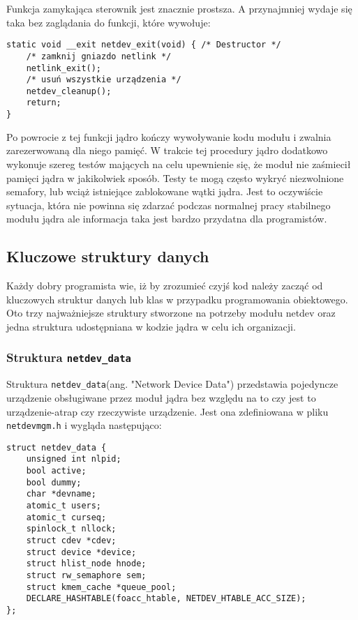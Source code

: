 \documentclass[10pt]{scrartcl}
\begin{document}
\newpage
Funkcja zamykająca sterownik jest znacznie prostsza. A przynajmniej wydaje się taka bez zaglądania do funkcji, które wywołuje:

\begin{verbatim}
static void __exit netdev_exit(void) { /* Destructor */
    /* zamknij gniazdo netlink */
    netlink_exit();
    /* usuń wszystkie urządzenia */
    netdev_cleanup();
    return;
}
\end{verbatim}

Po powrocie z tej funkcji jądro kończy wywoływanie kodu modułu i zwalnia zarezerwowaną dla niego pamięć. W trakcie tej procedury jądro dodatkowo wykonuje szereg testów mających na celu upewnienie się, że moduł nie zaśmiecił pamięci jądra w jakikolwiek sposób. Testy te mogą często wykryć niezwolnione semafory, lub wciąż istniejące zablokowane wątki jądra. Jest to oczywiście sytuacja, która nie powinna się zdarzać podczas normalnej pracy stabilnego modułu jądra ale informacja taka jest bardzo przydatna dla programistów.
\subsection{Kluczowe struktury danych}
\label{mainstructs}

Każdy dobry programista wie, iż by zrozumieć czyjś kod należy zacząć od kluczowych struktur danych lub klas w przypadku programowania obiektowego. Oto trzy najważniejsze struktury stworzone na potrzeby modułu netdev oraz jedna struktura udostępniana w kodzie jądra w celu ich organizacji.

\subsubsection{Struktura \texttt{\large{netdev\_data}}}

Struktura \texttt{netdev\_data}(ang. "Network Device Data") przedstawia pojedyncze urządzenie obsługiwane przez moduł jądra bez względu na to czy jest to urządzenie-atrap czy rzeczywiste urządzenie.  Jest ona zdefiniowana w pliku \texttt{netdevmgm.h} i wygląda następująco:

\begin{verbatim}
struct netdev_data {
    unsigned int nlpid;
    bool active;
    bool dummy;
    char *devname;
    atomic_t users;
    atomic_t curseq;
    spinlock_t nllock;
    struct cdev *cdev;
    struct device *device;
    struct hlist_node hnode;
    struct rw_semaphore sem;
    struct kmem_cache *queue_pool;
    DECLARE_HASHTABLE(foacc_htable, NETDEV_HTABLE_ACC_SIZE);
};
\end{verbatim}
\end{document}
